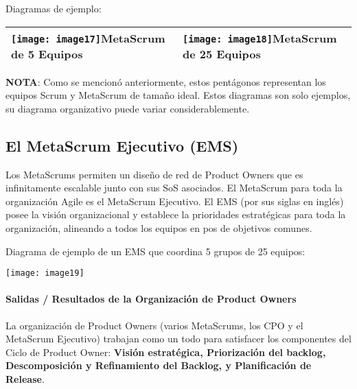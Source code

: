 \documentclass{article} %
\begin{document}
\noindent 

\noindent Diagramas de ejemplo: 

\noindent 

\begin{tabular}{|p{2.1in}|p{2.1in}|} \hline 
\texttt{[image: image17]}\newline MetaScrum de 5 Equipos & \texttt{[image: image18]}\newline MetaScrum de 25 Equipos \\ \hline 
\end{tabular}



\noindent \textbf{NOTA}: Como se mencion\'{o} anteriormente, estos pent\'{a}gonos representan los equipos Scrum y MetaScrum de tama\~{n}o ideal. Estos diagramas son solo ejemplos, su diagrama organizativo puede variar considerablemente.

\noindent 
\subsection{El MetaScrum Ejecutivo (EMS)}

\noindent Los MetaScrums permiten un dise\~{n}o de red de Product Owners que es infinitamente escalable junto con sus SoS asociados. El MetaScrum para toda la organizaci\'{o}n Agile es el MetaScrum Ejecutivo. El EMS (por sus siglas en ingl\'{e}s) posee la visi\'{o}n organizacional y establece la prioridades estrat\'{e}gicas para toda la organizaci\'{o}n, alineando a todos los equipos en pos de objetivos comunes.

\noindent 

\noindent Diagrama de ejemplo de un EMS que coordina 5 grupos de 25 equipos:

\noindent \texttt{[image: image19]}

\noindent 
\paragraph{Salidas / Resultados de la Organizaci\'{o}n de Product Owners}

\noindent 

\noindent La organizaci\'{o}n de Product Owners (varios MetaScrums, los CPO y el MetaScrum Ejecutivo) trabajan como un todo para satisfacer los componentes del Ciclo de Product Owner: \textbf{Visi\'{o}n estrat\'{e}gica, Priorizaci\'{o}n del backlog, Descomposici\'{o}n y Refinamiento del Backlog, y Planificaci\'{o}n de Release}.
\end{document}
